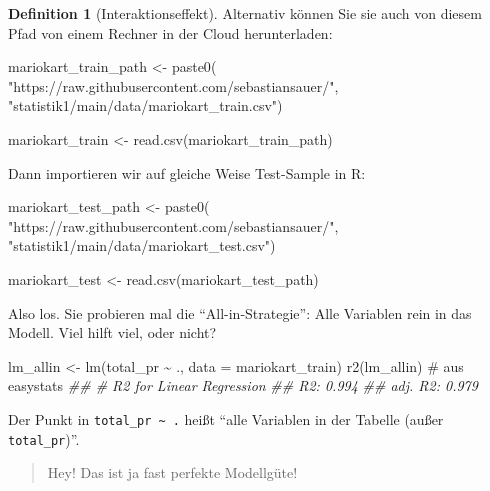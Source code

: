 \documentclass[
  letterpaper,
]{scrbook}
\newenvironment{Shaded}{\begin{snugshade}}{\end{snugshade}}
\newcommand{\AttributeTok}[1]{\textcolor[rgb]{0.40,0.45,0.13}{#1}}
\newcommand{\CommentTok}[1]{\textcolor[rgb]{0.37,0.37,0.37}{#1}}
\newcommand{\DocumentationTok}[1]{\textcolor[rgb]{0.37,0.37,0.37}{\textit{#1}}}
\newcommand{\FunctionTok}[1]{\textcolor[rgb]{0.28,0.35,0.67}{#1}}
\newcommand{\NormalTok}[1]{\textcolor[rgb]{0.00,0.23,0.31}{#1}}
\newcommand{\OtherTok}[1]{\textcolor[rgb]{0.00,0.23,0.31}{#1}}
\newcommand{\SpecialCharTok}[1]{\textcolor[rgb]{0.37,0.37,0.37}{#1}}
\newcommand{\StringTok}[1]{\textcolor[rgb]{0.13,0.47,0.30}{#1}}
\theoremstyle{definition}
\theoremstyle{definition}
\theoremstyle{definition}
\newtheorem{definition}{Definition}[chapter]
\theoremstyle{remark}
\begin{document}
\begin{definition}[Interaktionseffekt]
Alternativ können Sie sie auch von diesem Pfad von einem Rechner in der
Cloud herunterladen:

\begin{Shaded}
\begin{Highlighting}[]
\NormalTok{mariokart\_train\_path }\OtherTok{\textless{}{-}} \FunctionTok{paste0}\NormalTok{( }\StringTok{"https://raw.githubusercontent.com/sebastiansauer/"}\NormalTok{,}
\StringTok{"statistik1/main/data/mariokart\_train.csv"}\NormalTok{)}

\NormalTok{mariokart\_train }\OtherTok{\textless{}{-}} \FunctionTok{read.csv}\NormalTok{(mariokart\_train\_path)}
\end{Highlighting}
\end{Shaded}

Dann importieren wir auf gleiche Weise Test-Sample in R:

\begin{Shaded}
\begin{Highlighting}[]
\NormalTok{mariokart\_test\_path }\OtherTok{\textless{}{-}} \FunctionTok{paste0}\NormalTok{(}
 \StringTok{"https://raw.githubusercontent.com/sebastiansauer/"}\NormalTok{,}
 \StringTok{"statistik1/main/data/mariokart\_test.csv"}\NormalTok{)}

\NormalTok{mariokart\_test }\OtherTok{\textless{}{-}} \FunctionTok{read.csv}\NormalTok{(mariokart\_test\_path)}
\end{Highlighting}
\end{Shaded}

Also los. Sie probieren mal die \enquote{All-in-Strategie}: Alle
Variablen rein in das Modell. Viel hilft viel, oder nicht?

\begin{Shaded}
\begin{Highlighting}[]
\NormalTok{lm\_allin }\OtherTok{\textless{}{-}} \FunctionTok{lm}\NormalTok{(total\_pr }\SpecialCharTok{\textasciitilde{}}\NormalTok{ ., }\AttributeTok{data =}\NormalTok{ mariokart\_train)}
\FunctionTok{r2}\NormalTok{(lm\_allin)  }\CommentTok{\# aus easystats}
\DocumentationTok{\#\# \# R2 for Linear Regression}
\DocumentationTok{\#\#        R2: 0.994}
\DocumentationTok{\#\#   adj. R2: 0.979}
\end{Highlighting}
\end{Shaded}

Der Punkt in \texttt{total\_pr\ \textasciitilde{}\ .} heißt
\enquote{alle Variablen in der Tabelle (außer \texttt{total\_pr})}.

\begin{quote}
{} Hey! Das ist ja fast perfekte Modellgüte!
\end{quote}


\end{definition}
\end{document}
